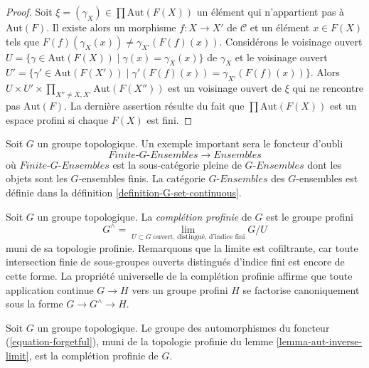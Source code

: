 \begin{proof}
Soit $\xi = (\gamma_X) \in \prod \text{Aut}(F(X))$ un élément qui
n'appartient pas à $\text{Aut}(F)$. Il existe alors un morphisme
$f : X \to X'$ de $\mathcal{C}$ et un élément $x \in F(X)$ tels que
$F(f)(\gamma_X(x)) \not = \gamma_{X'}(F(f)(x))$.
Considérons le voisinage ouvert
$U = \{\gamma \in \text{Aut}(F(X)) \mid \gamma(x) = \gamma_X(x)\}$
de $\gamma_X$ et le voisinage ouvert
$U' = \{\gamma' \in \text{Aut}(F(X')) \mid \gamma'(F(f)(x)) =
\gamma_{X'}(F(f)(x))\}$.
Alors
$U \times U' \times \prod_{X'' \not = X, X'} \text{Aut}(F(X''))$
est un voisinage ouvert de $\xi$ qui ne rencontre pas $\text{Aut}(F)$.
La dernière assertion résulte du fait que
$\prod \text{Aut}(F(X))$ est un espace profini si chaque $F(X)$ est fini.
\end{proof}

\begin{example}
\label{example-galois-category-G-sets}
Soit $G$ un groupe topologique. Un exemple important sera le foncteur d'oubli
\begin{equation}
\label{equation-forgetful}
\textit{Finite-}G\textit{-Ensembles} \longrightarrow \textit{Ensembles}
\end{equation}
où $\textit{Finite-}G\textit{-Ensembles}$ est la sous-catégorie pleine de
$G\textit{-Ensembles}$ dont les objets sont les $G$-ensembles finis.
La catégorie $G\textit{-Ensembles}$ des $G$-ensembles est définie dans la
définition \ref{definition-G-set-continuous}.
\end{example}

\noindent
Soit $G$ un groupe topologique. La {\it complétion profinie} de $G$ est le
groupe profini
$$
G^\wedge =
\lim_{U \subset G\text{ ouvert, distingué, d'indice fini}} G/U
$$
muni de sa topologie profinie. Remarquons que la limite est cofiltrante,
car toute intersection finie de sous-groupes ouverts distingués d'indice fini
est encore de cette forme. La propriété universelle de la complétion profinie
affirme que toute application continue $G \to H$ vers un groupe profini $H$
se factorise canoniquement sous la forme $G \to G^\wedge \to H$.

\begin{lemma}
\label{lemma-single-out-profinite}
Soit $G$ un groupe topologique. Le groupe des automorphismes du foncteur
(\ref{equation-forgetful}), muni de la topologie profinie du lemme
\ref{lemma-aut-inverse-limit}, est la complétion profinie de $G$.
\end{lemma}

